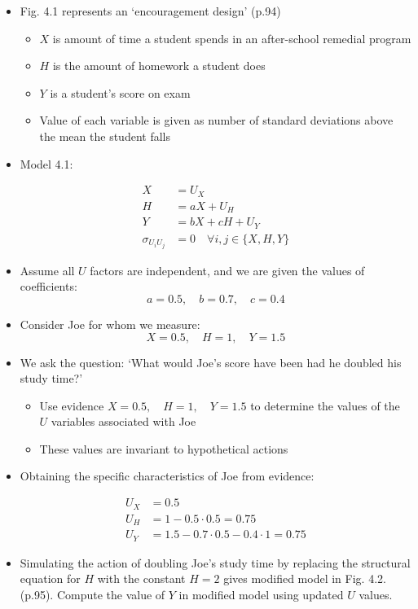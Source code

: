 \documentclass[]{article}
\providecommand{\tightlist}{%
  \setlength{\itemsep}{0pt}\setlength{\parskip}{0pt}}
\begin{document}
\begin{itemize}
\item
  Fig. 4.1 represents an `encouragement design' (p.94)

  \begin{itemize}
  \tightlist
  \item
    \(X\) is amount of time a student spends in an after-school remedial
    program
  \item
    \(H\) is the amount of homework a student does
  \item
    \(Y\) is a student's score on exam
  \item
    Value of each variable is given as number of standard deviations
    above the mean the student falls
  \end{itemize}
\item
  Model 4.1:

  \begin{equation*}
  \begin{split}
    X &= U_X \\
    H &= aX + U_H \\
    Y &= bX + cH + U_Y \\
    \sigma_{U_i U_j} &=0 \quad \forall i,j \in \{X, H, Y\}
  \end{split}
  \end{equation*}
\item
  Assume all \(U\) factors are independent, and we are given the values
  of coefficients: \[a = 0.5, \quad b = 0.7, \quad c = 0.4\]
\item
  Consider Joe for whom we measure:
  \[X = 0.5, \quad H = 1, \quad Y = 1.5\]
\item
  We ask the question: `What would Joe's score have been had he doubled
  his study time?'

  \begin{itemize}
  \tightlist
  \item
    Use evidence \(X = 0.5, \quad H = 1, \quad Y = 1.5\) to determine
    the values of the \(U\) variables associated with Joe
  \item
    These values are invariant to hypothetical actions
  \end{itemize}
\item
  Obtaining the specific characteristics of Joe from evidence:

  \begin{equation*}
  \begin{split}
    U_X &= 0.5 \\
    U_H &= 1 - 0.5 \cdot 0.5 = 0.75 \\
    U_Y &= 1.5 - 0.7 \cdot 0.5 - 0.4 \cdot 1 = 0.75
  \end{split}
  \end{equation*}
\item
  Simulating the action of doubling Joe's study time by replacing the
  structural equation for \(H\) with the constant \(H = 2\) gives
  modified model in Fig. 4.2. (p.95). Compute the value of \(Y\) in
  modified model using updated \(U\) values.


\end{itemize}
\end{document}
